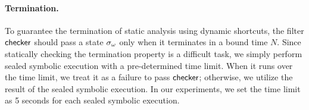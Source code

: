 \paragraph{Termination.}
To guarantee the termination of static analysis using dynamic shortcuts, the
filter $\textsf{checker}$ should pass a state ${\sigma}_\omega$ only when it terminates in a
bound time $N$.  Since statically checking the termination property is a difficult task,
we simply perform sealed symbolic execution with a pre-determined time limit.  When it runs
over the time limit, we treat it as a failure to pass $\textsf{checker}$; otherwise, we utilize
the result of the sealed symbolic execution.  In our experiments, we set the time limit as
5 seconds for each sealed symbolic execution.






